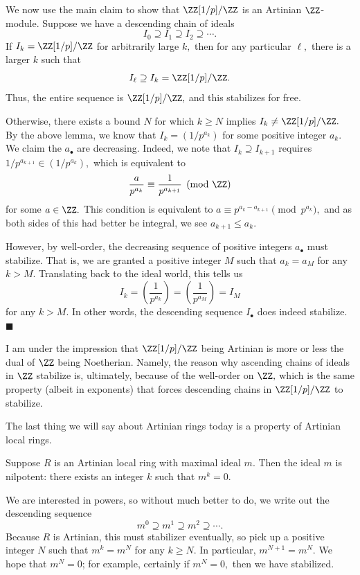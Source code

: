 We now use the main claim to show that $\ZZ[1/p]/\ZZ$ is an Artinian $\ZZ$-module. Suppose we have a descending chain of ideals
\[I_0\supseteq I_1\supseteq I_2\supseteq\cdots.\]
If $I_k=\ZZ[1/p]/\ZZ$ for arbitrarily large $k,$ then for any particular $\ell,$ there is a larger $k$ such that
\[I_\ell\supseteq I_k=\ZZ[1/p]/\ZZ.\]
Thus, the entire sequence is $\ZZ[1/p]/\ZZ,$ and this stabilizes for free.

Otherwise, there exists a bound $N$ for which $k\ge N$ implies $I_k\ne\ZZ[1/p]/\ZZ.$ By the above lemma, we know that $I_k=\left(1/p^{a_k}\right)$ for some positive integer $a_k.$ We claim the $a_\bullet$ are decreasing. Indeed, we note that $I_k\supseteq I_{k+1}$ requires $1/p^{a_{k+1}}\in\left(1/p^{a_k}\right),$ which is equivalent to
\[\frac a{p^{a_k}}\equiv\frac1{p^{a_{k+1}}}\pmod\ZZ\]
for some $a\in\ZZ.$ This condition is equivalent to $a\equiv p^{a_k-a_{k+1}}\pmod{p^{a_k}},$ and as both sides of this had better be integral, we see $a_{k+1}\le a_k.$

However, by well-order, the decreasing sequence of positive integers $a_\bullet$ must stabilize. That is, we are granted a positive integer $M$ such that $a_k=a_M$ for any $k>M.$ Translating back to the ideal world, this tells us
\[I_k=\left(\frac1{p^{a_k}}\right)=\left(\frac1{p^{a_M}}\right)=I_M\]
for any $k>M.$ In other words, the descending sequence $I_\bullet$ does indeed stabilize. $\blacksquare$

I am under the impression that $\ZZ[1/p]/\ZZ$ being Artinian is more or less the dual of $\ZZ$ being Noetherian. Namely, the reason why ascending chains of ideals in $\ZZ$ stabilize is, ultimately, because of the well-order on $\ZZ,$ which is the same property (albeit in exponents) that forces descending chains in $\ZZ[1/p]/\ZZ$ to stabilize.

The last thing we will say about Artinian rings today is a property of Artinian local rings.
\begin{proposition}
    Suppose $R$ is an Artinian local ring with maximal ideal $m.$ Then the ideal $m$ is nilpotent: there exists an integer $k$ such that $m^k=0.$
\end{proposition}
We are interested in powers, so without much better to do, we write out the descending sequence
\[m^0\supseteq m^1\supseteq m^2\supseteq\cdots.\]
Because $R$ is Artinian, this must stabilizer eventually, so pick up a positive integer $N$ such that $m^k=m^N$ for any $k\ge N.$ In particular, $m^{N+1}=m^N.$ We hope that $m^N=0$; for example, certainly if $m^N=0,$ then we have stabilized.

